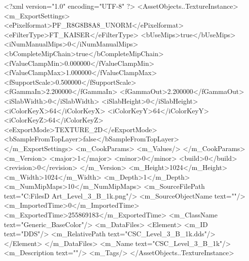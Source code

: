 <?xml version="1.0" encoding="UTF-8" ?>
<AssetObjects..TextureInstance>
	<m_ExportSettings>
		<ePixelformat>PF_R8G8B8A8_UNORM</ePixelformat>
		<eFilterType>FT_KAISER</eFilterType>
		<bUseMips>true</bUseMips>
		<iNumManualMips>0</iNumManualMips>
		<bCompleteMipChain>true</bCompleteMipChain>
		<fValueClampMin>0.000000</fValueClampMin>
		<fValueClampMax>1.000000</fValueClampMax>
		<fSupportScale>0.500000</fSupportScale>
		<fGammaIn>2.200000</fGammaIn>
		<fGammaOut>2.200000</fGammaOut>
		<iSlabWidth>0</iSlabWidth>
		<iSlabHeight>0</iSlabHeight>
		<iColorKeyX>64</iColorKeyX>
		<iColorKeyY>64</iColorKeyY>
		<iColorKeyZ>64</iColorKeyZ>
		<eExportMode>TEXTURE_2D</eExportMode>
		<bSampleFromTopLayer>false</bSampleFromTopLayer>
	</m_ExportSettings>
	<m_CookParams>
		<m_Values/>
	</m_CookParams>
	<m_Version>
		<major>1</major>
		<minor>0</minor>
		<build>0</build>
		<revision>0</revision>
	</m_Version>
	<m_Height>1024</m_Height>
	<m_Width>1024</m_Width>
	<m_Depth>1</m_Depth>
	<m_NumMipMaps>10</m_NumMipMaps>
	<m_SourceFilePath text="C:\Users\Shadow\Desktop\Working Files\3D Art\CSC_Level_3_B_1k.png"/>
	<m_SourceObjectName text=""/>
	<m_ImportedTime>0</m_ImportedTime>
	<m_ExportedTime>255869183</m_ExportedTime>
	<m_ClassName text="Generic_BaseColor"/>
	<m_DataFiles>
		<Element>
			<m_ID text="DDS"/>
			<m_RelativePath text="CSC_Level_3_B_1k.dds"/>
		</Element>
	</m_DataFiles>
	<m_Name text="CSC_Level_3_B_1k"/>
	<m_Description text=""/>
	<m_Tags/>
</AssetObjects..TextureInstance>

